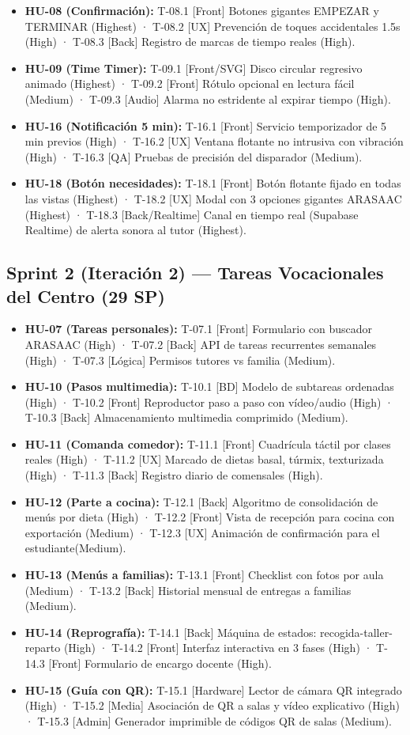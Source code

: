 \documentclass[11pt,a4paper]{article}
\begin{document}
\begin{itemize}
\item \textbf{HU-08 (Confirmación):} T-08.1 [Front] Botones gigantes EMPEZAR y TERMINAR (Highest) · T-08.2 [UX] Prevención de toques accidentales 1.5s (High) · T-08.3 [Back] Registro de marcas de tiempo reales (High).
\item \textbf{HU-09 (Time Timer):} T-09.1 [Front/SVG] Disco circular regresivo animado (Highest) · T-09.2 [Front] Rótulo opcional en lectura fácil (Medium) · T-09.3 [Audio] Alarma no estridente al expirar tiempo (High).
\item \textbf{HU-16 (Notificación 5 min):} T-16.1 [Front] Servicio temporizador de 5 min previos (High) · T-16.2 [UX] Ventana flotante no intrusiva con vibración (High) · T-16.3 [QA] Pruebas de precisión del disparador (Medium).
\item \textbf{HU-18 (Botón necesidades):} T-18.1 [Front] Botón flotante fijado en todas las vistas (Highest) · T-18.2 [UX] Modal con 3 opciones gigantes ARASAAC (Highest) · T-18.3 [Back/Realtime] Canal en tiempo real (Supabase Realtime) de alerta sonora al tutor (Highest).
\end{itemize}

\subsection{Sprint 2 (Iteración 2) — Tareas Vocacionales del Centro (29 SP)}
\begin{itemize}
\item \textbf{HU-07 (Tareas personales):} T-07.1 [Front] Formulario con buscador ARASAAC (High) · T-07.2 [Back] API de tareas recurrentes semanales (High) · T-07.3 [Lógica] Permisos tutores vs familia (Medium).
\item \textbf{HU-10 (Pasos multimedia):} T-10.1 [BD] Modelo de subtareas ordenadas (High) · T-10.2 [Front] Reproductor paso a paso con vídeo/audio (High) · T-10.3 [Back] Almacenamiento multimedia comprimido (Medium).
\item \textbf{HU-11 (Comanda comedor):} T-11.1 [Front] Cuadrícula táctil por clases reales (High) · T-11.2 [UX] Marcado de dietas basal, túrmix, texturizada (High) · T-11.3 [Back] Registro diario de comensales (High).
\item \textbf{HU-12 (Parte a cocina):} T-12.1 [Back] Algoritmo de consolidación de menús por dieta (High) · T-12.2 [Front] Vista de recepción para cocina con exportación (Medium) · T-12.3 [UX] Animación de confirmación para el estudiante(Medium).
\item \textbf{HU-13 (Menús a familias):} T-13.1 [Front] Checklist con fotos por aula (Medium) · T-13.2 [Back] Historial mensual de entregas a familias (Medium).
\item \textbf{HU-14 (Reprografía):} T-14.1 [Back] Máquina de estados: recogida-taller-reparto (High) · T-14.2 [Front] Interfaz interactiva en 3 fases (High) · T-14.3 [Front] Formulario de encargo docente (High).
\item \textbf{HU-15 (Guía con QR):} T-15.1 [Hardware] Lector de cámara QR integrado (High) · T-15.2 [Media] Asociación de QR a salas y vídeo explicativo (High) · T-15.3 [Admin] Generador imprimible de códigos QR de salas (Medium).
\end{itemize}
\end{document}
